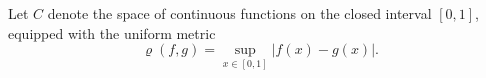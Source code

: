 Let $C$ denote the space of continuous functions on the closed interval $[0, 1]$, equipped with the uniform metric
$$\varrho(f, g) = \sup_{x \in [0,1]} |f(x) - g(x)|.$$
